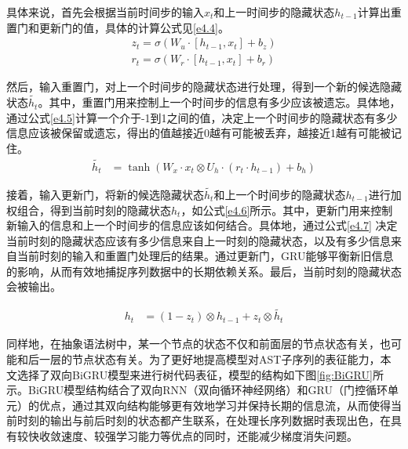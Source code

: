 具体来说，首先会根据当前时间步的输入$x_{t}$和上一时间步的隐藏状态$h_{t-1}$计算出重置门和更新门的值，具体的计算公式见\ref{e4.4}。
\begin{equation}\label{e4.4}
  \begin{split}
    z_{t} = \sigma \left(W_{u} \cdot \left[h_{t-1},x_{t}\right] + b_z \right)
    \\
    r_{t} = \sigma \left(W_{r} \cdot \left[h_{t-1},x_{t}\right]  + b_r \right)
  \end{split}
\end{equation}

然后，输入重置门，对上一个时间步的隐藏状态进行处理，得到一个新的候选隐藏状态$\widetilde{h_t}$。其中，重置门用来控制上一个时间步的信息有多少应该被遗忘。具体地，通过公式\ref{e4.5}计算一个介于-1到1之间的值，决定上一个时间步的隐藏状态有多少信息应该被保留或遗忘，得出的值越接近0越有可能被丢弃，越接近1越有可能被记住。
\begin{equation}\label{e4.5}
  \begin{split}
    \widetilde{h_t} &= \tanh \left(W_x \cdot x_t \otimes U_h \cdot\left(r_t \cdot h_{t-1}\right) + b_h  \right)
  \end{split}
\end{equation}

接着，输入更新门，将新的候选隐藏状态$\widetilde{h_t}$和上一个时间步的隐藏状态$h_{t-1}$进行加权组合，得到当前时刻的隐藏状态$h_t$，如公式\ref{e4.6}所示。其中，更新门用来控制新输入的信息和上一个时间步的信息应该如何结合。具体地，通过公式\ref{e4.7} 决定当前时刻的隐藏状态应该有多少信息来自上一时刻的隐藏状态，以及有多少信息来自当前时刻的输入和重置门处理后的结果。通过更新门，GRU能够平衡新旧信息的影响，从而有效地捕捉序列数据中的长期依赖关系。最后，当前时刻的隐藏状态会被输出。

\begin{equation}\label{e4.6}
  \begin{split}
   h_t &= \left(1- z_t\right) \otimes h_{t-1} +  z_t \otimes \widetilde{h_t}
  \end{split}
\end{equation}

同样地，在抽象语法树中，某一个节点的状态不仅和前面层的节点状态有关，也可能和后一层的节点状态有关。为了更好地提高模型对AST子序列的表征能力，本文选择了双向BiGRU模型来进行树代码表征，模型的结构如下图\ref{fig:BiGRU}所示。BiGRU模型结构结合了双向RNN（双向循环神经网络）和GRU（门控循环单元）的优点，通过其双向结构能够更有效地学习并保持长期的信息流，从而使得当前时刻的输出与前后时刻的状态都产生联系，在处理长序列数据时表现出色，在具有较快收敛速度、较强学习能力等优点的同时，还能减少梯度消失问题。

